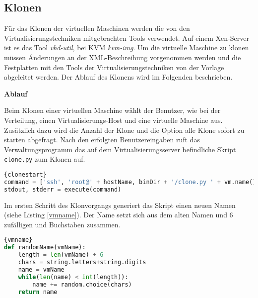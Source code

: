 \subsection{Klonen}
Für das Klonen der virtuellen Maschinen werden die von den Virtualisierungstechniken mitgebrachten Tools verwendet. Auf einem Xen-Server ist es das Tool \textit{vhd-util}, bei KVM \textit{kvm-img}. Um die virtuelle Maschine zu klonen müssen Änderungen an der XML-Beschreibung vorgenommen werden und die Festplatten mit den Tools der Virtualisierungstechniken von der Vorlage abgeleitet werden. Der Ablauf des Klonens wird im Folgenden beschrieben.  %

\textbf{Ablauf}

Beim Klonen einer virtuellen Maschine wählt der Benutzer, wie bei der Verteilung, einen Virtualisierungs-Host und eine virtuelle Maschine aus. Zusätzlich dazu wird die Anzahl der Klone und die Option alle Klone sofort zu starten abgefragt. Nach den erfolgten Benutzereingaben ruft das Verwaltungsprogramm das auf dem Virtualisierungsserver befindliche Skript \lstinline|clone.py| zum Klonen auf.
\\
\begin{lstlisting}[caption=Starten des Klonvorgangs (cow.py),language=Python,label=clonestart]{clonestart}
command = ['ssh', 'root@' + hostName, binDir + '/clone.py ' + vm.name() + ' ' + cloneCount + ' ' + autostart + ' ' + str(debug)]
stdout, stderr = execute(command)
\end{lstlisting}

Im ersten Schritt des Klonvorgangs generiert das Skript einen neuen Namen (siehe Listing \ref{vmname}). Der Name setzt sich aus dem alten Namen und 6 zufälligen und Buchstaben zusammen.
\\
\begin{lstlisting}[caption=Erstellen des Namens der VM (clone.py),language=Python, label=vmname]{vmname}
def randomName(vmName):
	length = len(vmName) + 6
	chars = string.letters+string.digits
	name = vmName
	while(len(name) < int(length)):
		name += random.choice(chars)
	return name
\end{lstlisting}

